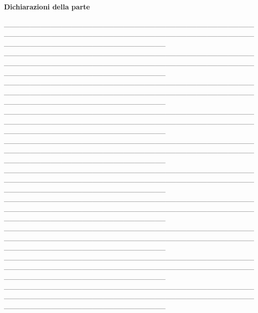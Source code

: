 \documentclass[12pt]{article}
\begin{document}
\newpage

\begin{center}
    \textbf{Dichiarazioni della parte}
\end{center}

\_\_\_\_\_\_\_\_\_\_\_\_\_\_\_\_\_\_\_\_\_\_\_\_\_\_\_\_\_\_\_\_\_\_\_\_\_\_\_\_\_\_\_\_\_\_\_\_\_\_\_\_\_\_\_\_\_\_\_\_\_\_\_\_\_\_\_\_\_\_\_\_\_\_\_\_\_\_\_\_\_\_\_\_\_\_\_\_\_\_\_\_\_\_\_\_\_\_\_\_\_\_\_\_\_\_\_\_\_\_\_\_\_\_\_\_\_\_\_\_\_\_\_\_\_\_\_ \\
\_\_\_\_\_\_\_\_\_\_\_\_\_\_\_\_\_\_\_\_\_\_\_\_\_\_\_\_\_\_\_\_\_\_\_\_\_\_\_\_\_\_\_\_\_\_\_\_\_\_\_\_\_\_\_\_\_\_\_\_\_\_\_\_\_\_\_\_\_\_\_\_\_\_\_\_\_\_\_\_\_\_\_\_\_\_\_\_\_\_\_\_\_\_\_\_\_\_\_\_\_\_\_\_\_\_\_\_\_\_\_\_\_\_\_\_\_\_\_\_\_\_\_\_\_\_\_ \\\_\_\_\_\_\_\_\_\_\_\_\_\_\_\_\_\_\_\_\_\_\_\_\_\_\_\_\_\_\_\_\_\_\_\_\_\_\_\_\_\_\_\_\_\_\_\_\_\_\_\_\_\_\_\_\_\_\_\_\_\_\_\_\_\_\_\_\_\_\_\_\_\_\_\_\_\_\_\_\_\_\_\_\_\_\_\_\_\_\_\_\_\_\_\_\_\_\_\_\_\_\_\_\_\_\_\_\_\_\_\_\_\_\_\_\_\_\_\_\_\_\_\_\_\_\_\_ \\\_\_\_\_\_\_\_\_\_\_\_\_\_\_\_\_\_\_\_\_\_\_\_\_\_\_\_\_\_\_\_\_\_\_\_\_\_\_\_\_\_\_\_\_\_\_\_\_\_\_\_\_\_\_\_\_\_\_\_\_\_\_\_\_\_\_\_\_\_\_\_\_\_\_\_\_\_\_\_\_\_\_\_\_\_\_\_\_\_\_\_\_\_\_\_\_\_\_\_\_\_\_\_\_\_\_\_\_\_\_\_\_\_\_\_\_\_\_\_\_\_\_\_\_\_\_\_ \\\_\_\_\_\_\_\_\_\_\_\_\_\_\_\_\_\_\_\_\_\_\_\_\_\_\_\_\_\_\_\_\_\_\_\_\_\_\_\_\_\_\_\_\_\_\_\_\_\_\_\_\_\_\_\_\_\_\_\_\_\_\_\_\_\_\_\_\_\_\_\_\_\_\_\_\_\_\_\_\_\_\_\_\_\_\_\_\_\_\_\_\_\_\_\_\_\_\_\_\_\_\_\_\_\_\_\_\_\_\_\_\_\_\_\_\_\_\_\_\_\_\_\_\_\_\_\_ \\\_\_\_\_\_\_\_\_\_\_\_\_\_\_\_\_\_\_\_\_\_\_\_\_\_\_\_\_\_\_\_\_\_\_\_\_\_\_\_\_\_\_\_\_\_\_\_\_\_\_\_\_\_\_\_\_\_\_\_\_\_\_\_\_\_\_\_\_\_\_\_\_\_\_\_\_\_\_\_\_\_\_\_\_\_\_\_\_\_\_\_\_\_\_\_\_\_\_\_\_\_\_\_\_\_\_\_\_\_\_\_\_\_\_\_\_\_\_\_\_\_\_\_\_\_\_\_ \\\_\_\_\_\_\_\_\_\_\_\_\_\_\_\_\_\_\_\_\_\_\_\_\_\_\_\_\_\_\_\_\_\_\_\_\_\_\_\_\_\_\_\_\_\_\_\_\_\_\_\_\_\_\_\_\_\_\_\_\_\_\_\_\_\_\_\_\_\_\_\_\_\_\_\_\_\_\_\_\_\_\_\_\_\_\_\_\_\_\_\_\_\_\_\_\_\_\_\_\_\_\_\_\_\_\_\_\_\_\_\_\_\_\_\_\_\_\_\_\_\_\_\_\_\_\_\_ \\\_\_\_\_\_\_\_\_\_\_\_\_\_\_\_\_\_\_\_\_\_\_\_\_\_\_\_\_\_\_\_\_\_\_\_\_\_\_\_\_\_\_\_\_\_\_\_\_\_\_\_\_\_\_\_\_\_\_\_\_\_\_\_\_\_\_\_\_\_\_\_\_\_\_\_\_\_\_\_\_\_\_\_\_\_\_\_\_\_\_\_\_\_\_\_\_\_\_\_\_\_\_\_\_\_\_\_\_\_\_\_\_\_\_\_\_\_\_\_\_\_\_\_\_\_\_\_ \\\_\_\_\_\_\_\_\_\_\_\_\_\_\_\_\_\_\_\_\_\_\_\_\_\_\_\_\_\_\_\_\_\_\_\_\_\_\_\_\_\_\_\_\_\_\_\_\_\_\_\_\_\_\_\_\_\_\_\_\_\_\_\_\_\_\_\_\_\_\_\_\_\_\_\_\_\_\_\_\_\_\_\_\_\_\_\_\_\_\_\_\_\_\_\_\_\_\_\_\_\_\_\_\_\_\_\_\_\_\_\_\_\_\_\_\_\_\_\_\_\_\_\_\_\_\_\_ \\\_\_\_\_\_\_\_\_\_\_\_\_\_\_\_\_\_\_\_\_\_\_\_\_\_\_\_\_\_\_\_\_\_\_\_\_\_\_\_\_\_\_\_\_\_\_\_\_\_\_\_\_\_\_\_\_\_\_\_\_\_\_\_\_\_\_\_\_\_\_\_\_\_\_\_\_\_\_\_\_\_\_\_\_\_\_\_\_\_\_\_\_\_\_\_\_\_\_\_\_\_\_\_\_\_\_\_\_\_\_\_\_\_\_\_\_\_\_\_\_\_\_\_\_\_\_\_
\end{document}
